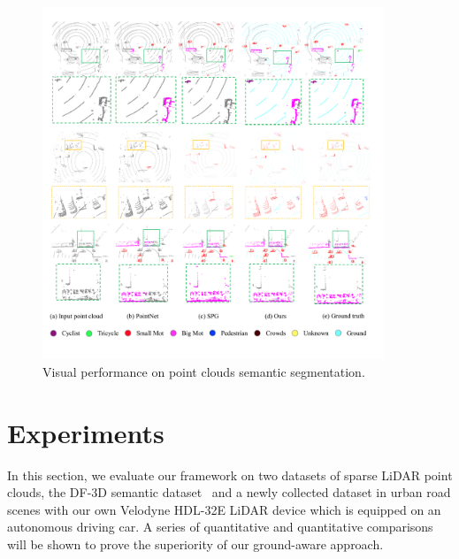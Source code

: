 \documentclass{sip}%
\begin{document}
\begin{figure}[hpt]
\setlength{\abovecaptionskip}{-10pt}
\setlength{\belowcaptionskip}{-0.cm}
    \centering
    \includegraphics[width=0.91\textwidth]{result.pdf}
    \caption{Visual performance on point clouds semantic segmentation.}
    \label{fig:vis}
\end{figure}


\section{Experiments}\label{sec:exp}
In this section, we evaluate our framework on two datasets of sparse LiDAR point clouds, the DF-3D semantic dataset~\cite{timmurphy.org} and a newly collected dataset in urban road scenes with our own Velodyne HDL-32E LiDAR device which is equipped on an autonomous driving car.
A series of quantitative and quantitative comparisons will be shown to prove the superiority of our ground-aware approach.
\end{document}
